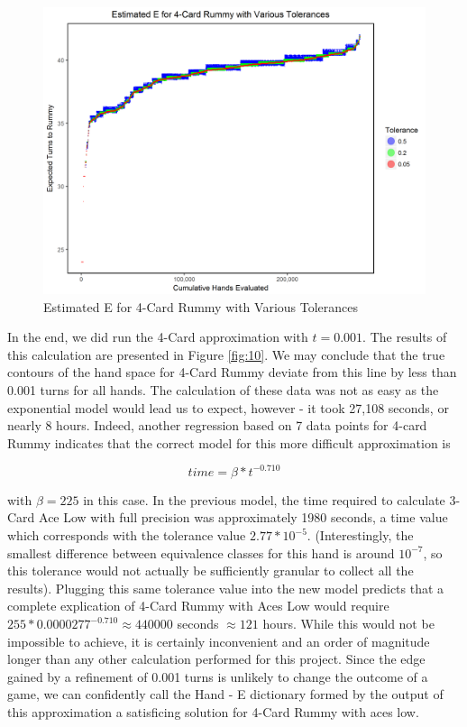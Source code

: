 \documentclass[paper=a4, fontsize=11pt,twoside]{report}   %
\begin{document}
\begin{figure}
\includegraphics[width=\textwidth]{fig9.png}
\caption{Estimated E for 4-Card Rummy with Various Tolerances}\label{fig:9}
\end{figure}

In the end, we did run the 4-Card approximation with $t=0.001$. The results of this calculation are presented in Figure \ref{fig:10}. We may conclude that the true contours of the hand space for 4-Card Rummy deviate from this line by less than 0.001 turns for all hands. The calculation of these data was not as easy as the exponential model would lead us to expect, however - it took 27,108 seconds, or nearly 8 hours. Indeed, another regression based on 7 data points for 4-card Rummy indicates that the correct model for this more difficult approximation is

$$time = \beta * t^{-0.710}$$

with $\beta = 225$ in this case. In the previous model, the time required to calculate 3-Card Ace Low with full precision was approximately 1980 seconds, a time value which corresponds with the tolerance value $2.77*10^{-5}$. (Interestingly, the smallest difference between equivalence classes for this hand is around $10^{-7}$, so this tolerance would not actually be sufficiently granular to collect all the results). Plugging this same tolerance value into the new model predicts that a complete explication of 4-Card Rummy with Aces Low would require $255 * 0.0000277^{-0.710} \approx 440000$ seconds $\approx 121$ hours. While this would not be impossible to achieve, it is certainly inconvenient and an order of magnitude longer than any other calculation performed for this project. Since the edge gained by a refinement of 0.001 turns is unlikely to change the outcome of a game, we can confidently call the Hand - E dictionary formed by the output of this approximation a satisficing solution for 4-Card Rummy with aces low. 
\end{document}
